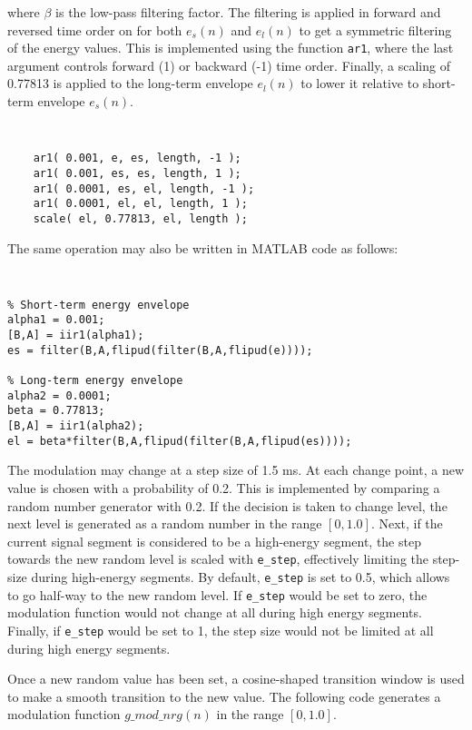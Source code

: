 where $\beta$ is the low-pass filtering factor. The filtering is applied in forward and reversed time order
on for both $e_s(n)$ and $e_l(n)$ to get a symmetric filtering of the energy values. This is implemented using
the function \texttt{ar1}, where the last argument controls forward (1) or backward (-1) time order. Finally,
a scaling of 0.77813 is applied to the long-term envelope $e_l(n)$ to lower it relative to short-term envelope 
$e_s(n)$. 

{\tt\small
\begin{verbatim}
    ar1( 0.001, e, es, length, -1 );
    ar1( 0.001, es, es, length, 1 );
    ar1( 0.0001, es, el, length, -1 );
    ar1( 0.0001, el, el, length, 1 );
    scale( el, 0.77813, el, length );
\end{verbatim}
}

The same operation may also be written in MATLAB code as follows:

{\tt\small
\begin{verbatim}
% Short-term energy envelope
alpha1 = 0.001;
[B,A] = iir1(alpha1);
es = filter(B,A,flipud(filter(B,A,flipud(e))));

% Long-term energy envelope
alpha2 = 0.0001;
beta = 0.77813;
[B,A] = iir1(alpha2);
el = beta*filter(B,A,flipud(filter(B,A,flipud(es))));
\end{verbatim}
}

The modulation may change at a step size of 1.5 ms. At each change point, a new value is chosen
with a probability of 0.2. This is implemented by comparing a random number generator with 0.2. If the decision
is taken to change level, the next level is generated as a random number in the range $[0,1.0]$. Next, if
the current signal segment is considered to be a high-energy segment, the step towards the new random level is
scaled with \texttt{e\_step}, effectively limiting the step-size during high-energy segments. By default, 
\texttt{e\_step} is set to 0.5, which allows to go half-way to the new random level. If \texttt{e\_step} would
be set to zero, the modulation function would not change at all during high energy segments. Finally, if \texttt{e\_step}
would be set to 1, the step size would not be limited at all during high energy segments.

Once a new random value has been set, a cosine-shaped transition window is used to make a smooth transition to the
new value. The following code generates a modulation function $g\_mod\_nrg(n)$ in the range $[0,1.0]$. 

